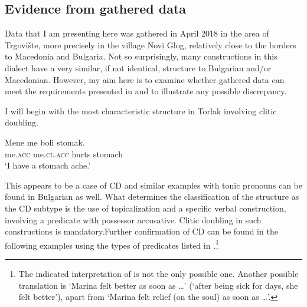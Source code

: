 \documentclass[output=paper,
colorlinks,
citecolor=brown,
newtxmath
]{langscibook}
\begin{document}
\subsection{Evidence from gathered data}                            %
\label{subsec:evidence}
Data that I am presenting here was gathered in April 2018 in the area of Trgovište, more precisely in the village Novi Glog, relatively close to the borders to Macedonia and Bulgaria. Not so surprisingly, many constructions in this dialect have a very similar, if not identical, structure to Bulgarian and/or Macedonian. However, my aim here is to examine whether gathered data can meet the requirements presented in \citet{Cinque.Krapova2008} and to illustrate any possible discrepancy.

I will begin with the most characteristic structure in Torlak involving clitic doubling.


\ea\label{ex:10}
\gll Mene   me        boli  stomak.\\
     me.\textsc{acc} me.\textsc{cl.acc} hurts stomach \\
\glt `I have a stomach ache.'
\z

\largerpage[-2] %
\noindent This appears to be a case of CD and similar examples with tonic pronouns can be found in Bulgarian as well. What determines the classification of the structure as the CD subtype is the use of topicalization and a specific verbal construction, involving a predicate with possessor accusative. Clitic doubling in such constructions is mandatory.\largerpage[-1] %
Further confirmation of CD can be found in the following examples using the types of predicates listed in \citet{Cinque.Krapova2008}.\footnote{The indicated interpretation of  is not the only possible one. Another possible translation is `Marina felt better as soon as {\dots}' (`after being sick for days, she felt better'), apart from `Marina felt relief (on the soul) as soon as {\dots}'.}
\end{document}
